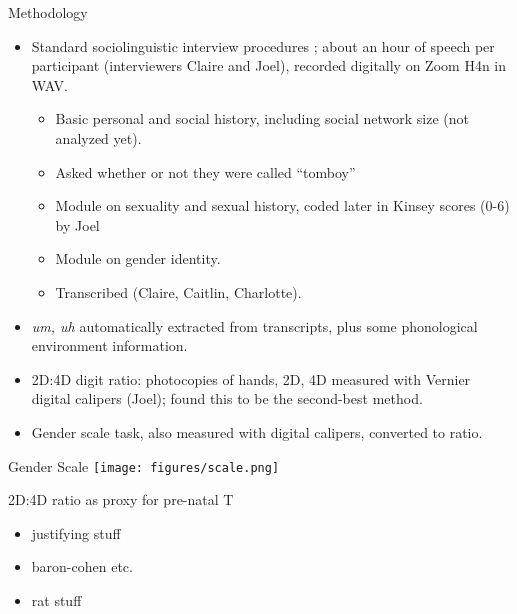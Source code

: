 \documentclass[hyperref={pdfpagelabels=false}]{beamer}
\begin{document}
\begin{frame}{Methodology}
\begin{itemize}
	\item Standard sociolinguistic interview procedures \citep{tagliamonte2006}; about an hour of speech per participant (interviewers Claire and Joel), recorded digitally on Zoom H4n in WAV.
		\begin{itemize}
			\item Basic personal and social history, including social network size (not analyzed yet).
			\item Asked whether or not they were called ``tomboy''
			\item Module on sexuality and sexual history, coded later in Kinsey scores (0-6) by Joel
			\item Module on gender identity.
			\item Transcribed (Claire, Caitlin, Charlotte).
		\end{itemize}
	\item \textsl{um, uh} automatically extracted from transcripts, plus some phonological environment information.
	\item 2D:4D digit ratio: photocopies of hands, 2D, 4D measured with Vernier digital calipers (Joel); \citet{allawayetal2009} found this to be the second-best method.
	\item Gender scale task, also measured with digital calipers, converted to ratio.
\end{itemize}
\end{frame}

\begin{frame}{Gender Scale}
	\texttt{[image: figures/scale.png]}
\end{frame}

\begin{frame}{2D:4D ratio as proxy for pre-natal T}
\begin{itemize}
	\item justifying stuff
	\item baron-cohen etc.
	\item rat stuff
\end{itemize}
\end{frame}
\end{document}
